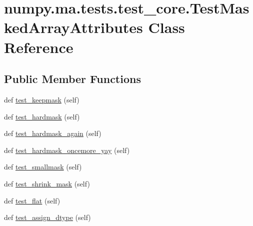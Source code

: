 \hypertarget{classnumpy_1_1ma_1_1tests_1_1test__core_1_1TestMaskedArrayAttributes}{}\section{numpy.\+ma.\+tests.\+test\+\_\+core.\+Test\+Masked\+Array\+Attributes Class Reference}
\label{classnumpy_1_1ma_1_1tests_1_1test__core_1_1TestMaskedArrayAttributes}
\subsection*{Public Member Functions}
\begin{DoxyCompactItemize}
\item 
def \hyperlink{classnumpy_1_1ma_1_1tests_1_1test__core_1_1TestMaskedArrayAttributes_ab88d3def7b0cbc1362ee4e635f7e480a}{test\+\_\+keepmask} (self)
\item 
def \hyperlink{classnumpy_1_1ma_1_1tests_1_1test__core_1_1TestMaskedArrayAttributes_a728432ea1d60e8b43a5e749f71a2a48f}{test\+\_\+hardmask} (self)
\item 
def \hyperlink{classnumpy_1_1ma_1_1tests_1_1test__core_1_1TestMaskedArrayAttributes_adba584975709d5873af66b0337f3ada7}{test\+\_\+hardmask\+\_\+again} (self)
\item 
def \hyperlink{classnumpy_1_1ma_1_1tests_1_1test__core_1_1TestMaskedArrayAttributes_abc1e915223b875efa543e10812e7d0f5}{test\+\_\+hardmask\+\_\+oncemore\+\_\+yay} (self)
\item 
def \hyperlink{classnumpy_1_1ma_1_1tests_1_1test__core_1_1TestMaskedArrayAttributes_a46b05008e70e192b9318e6b7997e6b0c}{test\+\_\+smallmask} (self)
\item 
def \hyperlink{classnumpy_1_1ma_1_1tests_1_1test__core_1_1TestMaskedArrayAttributes_a9ac2e773c99c9d06837cfd50e022fd94}{test\+\_\+shrink\+\_\+mask} (self)
\item 
def \hyperlink{classnumpy_1_1ma_1_1tests_1_1test__core_1_1TestMaskedArrayAttributes_a0acaea52ab5283640c8d7e87a96ff0e7}{test\+\_\+flat} (self)
\item 
def \hyperlink{classnumpy_1_1ma_1_1tests_1_1test__core_1_1TestMaskedArrayAttributes_aff03fcc28838fa5430b0f69e4c7d09ed}{test\+\_\+assign\+\_\+dtype} (self)
\end{DoxyCompactItemize}


